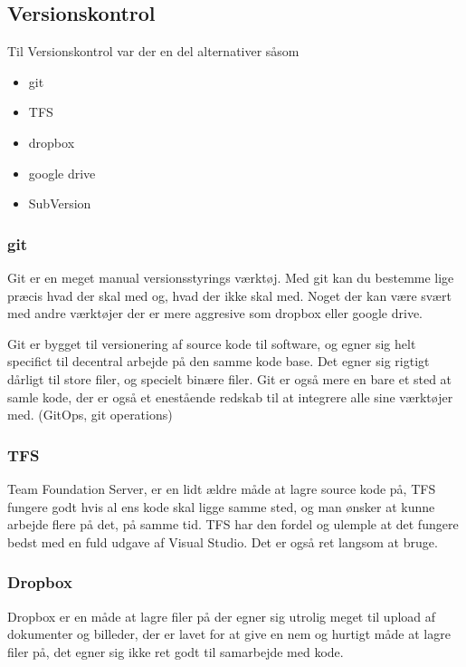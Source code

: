 \subsection{Versionskontrol}

Til Versionskontrol var der en del alternativer såsom

\begin{itemize}
    \item git
    \item TFS
    \item dropbox
    \item google drive
    \item SubVersion 
\end{itemize}

\subsubsection{git}

Git er en meget manual versionsstyrings værktøj. Med git kan du bestemme lige præcis hvad der skal med og, hvad der ikke skal med. Noget der kan være svært med andre værktøjer der er mere aggresive som dropbox eller google drive.

Git er bygget til versionering af source kode til software, og egner sig helt specifict til decentral arbejde på den samme kode base. Det egner sig rigtigt dårligt til store filer, og specielt binære filer. Git er også mere en bare et sted at samle kode, der er også et enestående redskab til at integrere alle sine værktøjer med. (GitOps, git operations)

\subsubsection{TFS}

Team Foundation Server, er en lidt ældre måde at lagre source kode på, TFS fungere godt hvis al ens kode skal ligge samme sted, og man ønsker at kunne arbejde flere på det, på samme tid. TFS har den fordel og ulemple at det fungere bedst med en fuld udgave af Visual Studio. Det er også ret langsom at bruge.

\subsubsection{Dropbox}

Dropbox er en måde at lagre filer på der egner sig utrolig meget til upload af dokumenter og billeder, der er lavet for at give en nem og hurtigt måde at lagre filer på, det egner sig ikke ret godt til samarbejde med kode.

